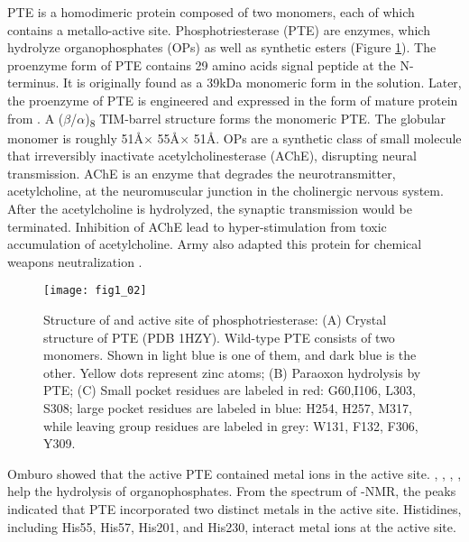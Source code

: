 \begin{refsection}
PTE is a homodimeric protein composed of two monomers, each of which contains a
metallo-active site. Phosphotriesterase (PTE) are enzymes, which hydrolyze
organophosphates (OPs) as well as synthetic esters (Figure
\ref{fig:pte-structure})\cite{Ghanem2005a}. The proenzyme form of PTE contains
29 amino acids signal peptide at the N-terminus. It is originally found as a
39kDa monomeric form in the solution\cite{Mulbry1989}. Later, the proenzyme of
PTE is engineered and expressed in the form of mature protein from . A ($\beta$/$\alpha$)\textsubscript{8} TIM-barrel structure forms the
monomeric PTE\cite{Roodveldt2005,Seibert2005}. The globular monomer is roughly
51\AA $\times$ 55\AA $\times$ 51\AA.  OPs are a synthetic class of small molecule
that irreversibly inactivate acetylcholinesterase (AChE), disrupting
neural transmission. AChE is an enzyme that degrades the neurotransmitter,
acetylcholine, at the neuromuscular junction in the cholinergic nervous system.
After the acetylcholine is hydrolyzed, the synaptic transmission would be
terminated. Inhibition of AChE lead to hyper-stimulation from toxic
accumulation of acetylcholine\cite{Soreq2001}. Army also adapted this protein
for chemical weapons neutralization \cite{Yang2014a}.

\begin{figure}[h!] \centering \texttt{[image: fig1\_02]}
    \caption[Structure of and active site of phosphotriesterase: (A) Crystal
    structure of PTE (PDB 1HZY). Wild-type PTE consists of two monomers. Shown
in light blue is one of them, and dark blue is the other. Yellow dots represent
zinc atoms; (B) Paraoxon hydrolysis by PTE; (C) Small pocket residues are
labeled in red: G60,I106, L303, S308; large pocket residues are labeled in
blue: H254, H257, M317, while leaving group residues are labeled in grey: W131,
F132, F306, Y309.] {Structure of and active site of phosphotriesterase: (A)
Crystal structure of PTE (PDB 1HZY). Wild-type PTE consists of two monomers.
Shown in light blue is one of them, and dark blue is the other. Yellow dots
represent zinc atoms; (B) Paraoxon hydrolysis by PTE;  (C) Small pocket
residues are labeled in red: G60,I106, L303, S308; large pocket residues are
labeled in blue: H254, H257, M317, while leaving group residues are labeled in
grey: W131, F132, F306, Y309.}
\label{fig:pte-structure} 
\end{figure} 

Omburo  showed that the active PTE contained metal ions in the
active site. , , , ,
 help the hydrolysis of organophosphates\cite{Omburo1992a}. From
the spectrum of -NMR, the peaks indicated that PTE incorporated
two distinct metals in the active site\cite{Omburo1993}. Histidines, including
His55, His57, His201, and His230, interact metal ions at the active
site\cite{Benning2001a}. 


\end{refsection}
